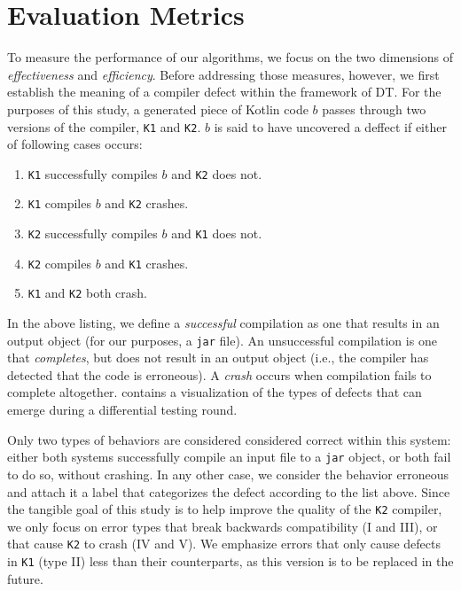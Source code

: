 \section{\label{sec:metrics}Evaluation Metrics}

To measure the performance of our algorithms, we focus on the two
dimensions of \textit{effectiveness} and \textit{efficiency}.
Before addressing those measures, however, we first establish
the meaning of a compiler defect within the framework
of \gls{DT}.
For the purposes of this study, a generated piece of Kotlin code
$b$ passes through two versions of the compiler,
\texttt{K1} and \texttt{K2}.
$b$ is said to have uncovered a deffect if either of following cases occurs:

\begin{enumerate}
    \item \texttt{K1} successfully compiles $b$ and \texttt{K2} does not.
    \item \texttt{K1} compiles $b$ and \texttt{K2} crashes.
    \item \texttt{K2} successfully compiles $b$ and \texttt{K1} does not.
    \item \texttt{K2} compiles $b$ and \texttt{K1} crashes.
    \item \texttt{K1} and \texttt{K2} both crash.
\end{enumerate}

In the above listing, we define a \textit{successful} compilation
as one that results in an output object
(for our purposes, a \texttt{jar} file).
An unsuccessful compilation is one that \textit{completes}, but
does not result in an output object (i.e., the compiler
has detected that the code is erroneous).
A \textit{crash} occurs when compilation fails to complete altogether.
 contains a visualization of the types of defects
that can emerge during a differential testing round.

Only two types of behaviors are considered considered correct within
this system: either both systems successfully compile an input
file to a \texttt{jar} object, or both fail to do so, without crashing.
In any other case, we consider the behavior erroneous and attach it a 
label that categorizes the defect according to the list above.
Since the tangible goal of this study is to help improve
the quality of the \texttt{K2} compiler, we only focus on error types
that break backwards compatibility (I and III), or that cause \texttt{K2}
to crash (IV and V).
We emphasize errors that only cause defects in \texttt{K1} (type II)
less than their counterparts, as this version is to be replaced in the future.

